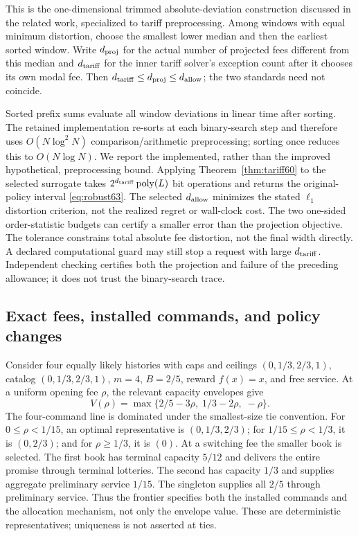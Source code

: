 This is the one-dimensional trimmed absolute-deviation construction discussed in the related work, specialized to tariff preprocessing. Among windows with equal minimum distortion, choose the smallest lower median and then the earliest sorted window. Write $d_{\rm proj}$ for the actual number of projected fees different from this median and $d_{\rm tariff}$ for the inner tariff solver's exception count after it chooses its own modal fee. Then $d_{\rm tariff}\leq d_{\rm proj}\leq d_{\rm allow}$; the two standards need not coincide.

Sorted prefix sums evaluate all window deviations in linear time after sorting. The retained implementation re-sorts at each binary-search step and therefore uses $O(N\log^2 N)$ comparison/arithmetic preprocessing; sorting once reduces this to $O(N\log N)$. We report the implemented, rather than the improved hypothetical, preprocessing bound. Applying Theorem~\ref{thm:tariff60} to the selected surrogate takes $2^{d_{\rm tariff}}\operatorname{poly}(L)$ bit operations and returns the original-policy interval \eqref{eq:robust63}. The selected $d_{\rm allow}$ minimizes the stated $\ell_1$ distortion criterion, not the realized regret or wall-clock cost. The two one-sided order-statistic budgets can certify a smaller error than the projection objective. The tolerance constrains total absolute fee distortion, not the final width directly. A declared computational guard may still stop a request with large $d_{\rm tariff}$. Independent checking certifies both the projection and failure of the preceding allowance; it does not trust the binary-search trace.

\subsection{Exact fees, installed commands, and policy changes}\label{sec:frontier63}
Consider four equally likely histories with caps and ceilings $(0,1/3,2/3,1)$, catalog $(0,1/3,2/3,1)$, $m=4$, $B=2/5$, reward $f(x)=x$, and free service. At a uniform opening fee $\rho$, the relevant capacity envelopes give
\[
 V(\rho)=\max\{2/5-3\rho,\;1/3-2\rho,\;-\rho\}.
\]
The four-command line is dominated under the smallest-size tie convention. For $0\leq\rho<1/15$, an optimal representative is $(0,1/3,2/3)$; for $1/15\leq\rho<1/3$, it is $(0,2/3)$; and for $\rho\geq1/3$, it is $(0)$. At a switching fee the smaller book is selected. The first book has terminal capacity $5/12$ and delivers the entire promise through terminal lotteries. The second has capacity $1/3$ and supplies aggregate preliminary service $1/15$. The singleton supplies all $2/5$ through preliminary service. Thus the frontier specifies both the installed commands and the allocation mechanism, not only the envelope value. These are deterministic representatives; uniqueness is not asserted at ties.

